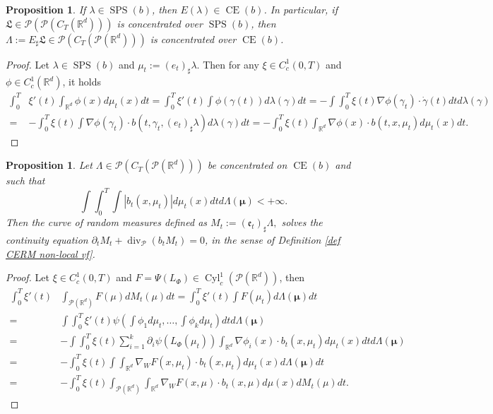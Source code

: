 \documentclass[10pt,leqno]{amsart}
\numberwithin{equation}{section}
\newtheorem{prop}[teorema]{Proposition}
\newcommand{\R}{\mathbb{R}}
\newcommand{\PP}{\mathcal{P}}
\begin{document}
\begin{prop}\label{L to Lambda section 5}
    If $\lambda \in \operatorname{SPS}(b)$, then $E(\lambda) \in \operatorname{CE}(b)$. In particular, if
    $\mathfrak{L}\in \PP(\PP(C_T(\R^d)))$ is concentrated over $\operatorname{SPS}(b)$, then $\Lambda := E_\sharp \mathfrak{L} \in \PP(C_T(\PP(\R^d)))$ is concentrated over $\operatorname{CE}(b)$.
\end{prop}

\begin{proof}
    Let $\lambda \in \operatorname{SPS}(b)$ and $\mu_t:= (e_t)_\sharp \lambda$. Then for any $\xi \in C_c^1(0,T)$ and $\phi \in C_c^1(\R^d)$, it holds 
    \begin{align*}
        \int_0^T & \xi'(t)  \int_{\R^d} \phi(x) d\mu_t(x) dt 
        =
        \int_0^T \xi'(t) \int \phi(\gamma(t)) d\lambda(\gamma) dt
        = 
        - \int \int_0^T\xi(t) \nabla \phi(\gamma_t) \cdot \dot\gamma(t) dt d\lambda(\gamma)
        \\
        = & 
        - \int_0^T \xi(t) \int \nabla\phi(\gamma_t) \cdot b(t,\gamma_t,(e_t)_\sharp \lambda) d\lambda(\gamma) dt
        = 
        - \int_0^T \xi(t) \int_{\R^d} \nabla\phi(x) \cdot b(t,x,\mu_t) d\mu_t(x) dt.
    \end{align*}
\end{proof}

\begin{prop}\label{Lambda to M_t section 5}
    Let $\Lambda\in \PP(C_T(\PP(\R^d)))$ be concentrated on $\operatorname{CE}(b)$ and such that \[\int \int_0^T \int |b_t(x,\mu_t)|d\mu_t(x) dt d\Lambda(\boldsymbol{\mu})<+\infty.\] Then the curve of random measures defined as 
    $M_t:= (\mathfrak{e}_t)_\sharp \Lambda,$
    solves the continuity equation $\partial_tM_t + \operatorname{div}_\PP(b_t M_t) = 0$, in the sense of Definition \ref{def CERM non-local vf}.
\end{prop}

\begin{proof}
    Let $\xi\in C_c^1(0,T)$ and $F = \Psi (L_\Phi) \in \operatorname{Cyl}_c^1(\PP(\R^d))$, then 
    \begin{align*}
        \int_0^T \xi'(t) & \int_{\PP(\R^d)} F(\mu) dM_t(\mu) dt 
        = 
        \int_0^T \xi'(t) \int F(\mu_t) d\Lambda(\boldsymbol{\mu}) dt 
        \\
        = &
        \int \int_0^T \xi'(t) \psi\left( \int \phi_1 d\mu_t, \dots , \int \phi_k d\mu_t \right) dt d\Lambda(\boldsymbol{\mu})
        \\
        = &
        - \int \int_0^T \xi(t) \sum_{i=1}^k \partial_i \psi(L_\Phi(\mu_t)) \int_{\R^d} \nabla \phi_i(x)\cdot b_t(x,\mu_t) d\mu_t(x) dt d\Lambda(\boldsymbol{\mu})
        \\
        = & 
        - \int_0^T \xi(t) \int \int_{\R^d} \nabla_W F(x,\mu_t)\cdot b_t(x,\mu_t) d\mu_t(x) d\Lambda(\boldsymbol{\mu}) dt 
        \\
        = & 
        - \int_0^T \xi(t) \int_{\PP(\R^d)} \int_{\R^d} \nabla_W F(x,\mu)\cdot b_t(x,\mu) d\mu(x) dM_t(\mu) dt.
    \end{align*}
\end{proof}
\end{document}
